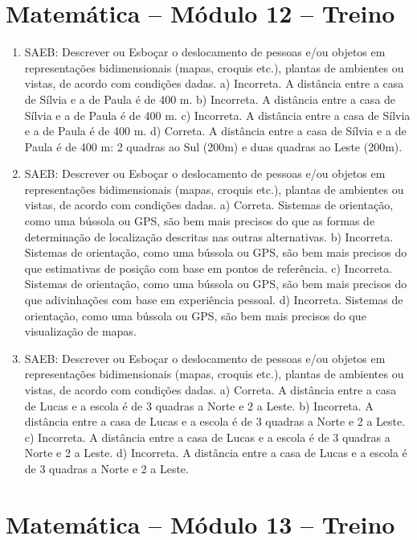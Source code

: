 \section*{Matemática – Módulo 12 – Treino}

\begin{enumerate}
\item
SAEB: Descrever ou Esboçar o deslocamento de pessoas e/ou objetos em representações bidimensionais (mapas, croquis etc.), plantas de ambientes ou vistas, de acordo com condições dadas.
a) Incorreta. A distância entre a casa de Sílvia e a de Paula é de 400 m.
b) Incorreta. A distância entre a casa de Sílvia e a de Paula é de 400 m.
c) Incorreta. A distância entre a casa de Sílvia e a de Paula é de 400 m.
d) Correta. A distância entre a casa de Sílvia e a de Paula é de 400 m:  2 quadras 
ao Sul (200m) e duas quadras ao Leste (200m).

\item
SAEB: Descrever ou Esboçar o deslocamento de pessoas e/ou objetos em representações bidimensionais (mapas, croquis etc.), plantas de ambientes ou vistas, de acordo com condições dadas.
a) Correta. Sistemas de orientação, como uma bússola ou GPS, são bem mais precisos do que
as formas de determinação de localização descritas nas outras alternativas.
b) Incorreta. Sistemas de orientação, como uma bússola ou GPS, são bem mais precisos do que 
estimativas de posição com base em pontos de referência.
c) Incorreta. Sistemas de orientação, como uma bússola ou GPS, são bem mais precisos do que 
adivinhações com base em experiência pessoal.
d) Incorreta. Sistemas de orientação, como uma bússola ou GPS, são bem mais precisos do que
visualização de mapas.

\item
SAEB: Descrever ou Esboçar o deslocamento de pessoas e/ou objetos em representações bidimensionais (mapas, croquis etc.), plantas de ambientes ou vistas, de acordo com condições dadas.
a) Correta. A distância entre a casa de Lucas e a escola é de 3 quadras a Norte e 2 a 
Leste.
b) Incorreta. A distância entre a casa de Lucas e a escola é de 3 quadras a Norte e 2 a 
Leste.
c) Incorreta. A distância entre a casa de Lucas e a escola é de 3 quadras a Norte e 2 a 
Leste.
d) Incorreta. A distância entre a casa de Lucas e a escola é de 3 quadras a Norte e 2 a 
Leste.
\end{enumerate}

\section*{Matemática – Módulo 13 – Treino}

